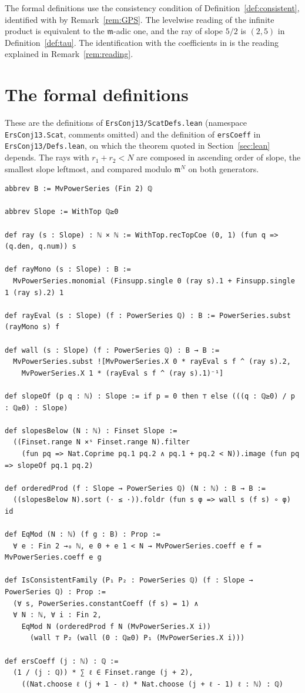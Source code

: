 \documentclass[11pt]{article}
\theoremstyle{definition}
\theoremstyle{remark}
\numberwithin{equation}{section}
\newcommand{\m}{\mathfrak{m}}
\begin{document}
\begin{appendices}
The formal definitions use the consistency condition of
Definition~\ref{def:consistent}, identified with \cite[\S1.3]{GPS} by
Remark~\ref{rem:GPS}. The levelwise reading of the infinite product is
equivalent to the $\m$-adic one, and the ray of slope $5/2$ is $(2,5)$
in Definition~\ref{def:tau}. The identification with the coefficients
in \cite{ERS} is the reading explained in Remark~\ref{rem:reading}.

\section{The formal definitions}\label{sec:lean-defs}
These are the definitions of \texttt{ErsConj13/ScatDefs.lean} (namespace
\texttt{ErsConj13.Scat}, comments omitted) and the definition of
\texttt{ersCoeff} in \texttt{ErsConj13/Defs.lean}, on which the theorem
quoted in Section~\ref{sec:lean} depends. The rays with $r_1+r_2<N$ are
composed in ascending order of slope, the smallest slope leftmost, and
compared modulo $\m^N$ on both generators.
{\scriptsize
\begin{verbatim}
abbrev B := MvPowerSeries (Fin 2) ℚ

abbrev Slope := WithTop ℚ≥0

def ray (s : Slope) : ℕ × ℕ := WithTop.recTopCoe (0, 1) (fun q => (q.den, q.num)) s

def rayMono (s : Slope) : B :=
  MvPowerSeries.monomial (Finsupp.single 0 (ray s).1 + Finsupp.single 1 (ray s).2) 1

def rayEval (s : Slope) (f : PowerSeries ℚ) : B := PowerSeries.subst (rayMono s) f

def wall (s : Slope) (f : PowerSeries ℚ) : B → B :=
  MvPowerSeries.subst ![MvPowerSeries.X 0 * rayEval s f ^ (ray s).2,
    MvPowerSeries.X 1 * (rayEval s f ^ (ray s).1)⁻¹]

def slopeOf (p q : ℕ) : Slope := if p = 0 then ⊤ else (((q : ℚ≥0) / p : ℚ≥0) : Slope)

def slopesBelow (N : ℕ) : Finset Slope :=
  ((Finset.range N ×ˢ Finset.range N).filter
    (fun pq => Nat.Coprime pq.1 pq.2 ∧ pq.1 + pq.2 < N)).image (fun pq => slopeOf pq.1 pq.2)

def orderedProd (f : Slope → PowerSeries ℚ) (N : ℕ) : B → B :=
  ((slopesBelow N).sort (· ≤ ·)).foldr (fun s φ => wall s (f s) ∘ φ) id

def EqMod (N : ℕ) (f g : B) : Prop :=
  ∀ e : Fin 2 →₀ ℕ, e 0 + e 1 < N → MvPowerSeries.coeff e f = MvPowerSeries.coeff e g

def IsConsistentFamily (P₁ P₂ : PowerSeries ℚ) (f : Slope → PowerSeries ℚ) : Prop :=
  (∀ s, PowerSeries.constantCoeff (f s) = 1) ∧
  ∀ N : ℕ, ∀ i : Fin 2,
    EqMod N (orderedProd f N (MvPowerSeries.X i))
      (wall ⊤ P₂ (wall (0 : ℚ≥0) P₁ (MvPowerSeries.X i)))

def ersCoeff (j : ℕ) : ℚ :=
  (1 / (j : ℚ)) * ∑ ℓ ∈ Finset.range (j + 2),
    ((Nat.choose ℓ (j + 1 - ℓ) * Nat.choose (j + ℓ - 1) ℓ : ℕ) : ℚ)
\end{verbatim}
}
\end{appendices}
\end{document}
